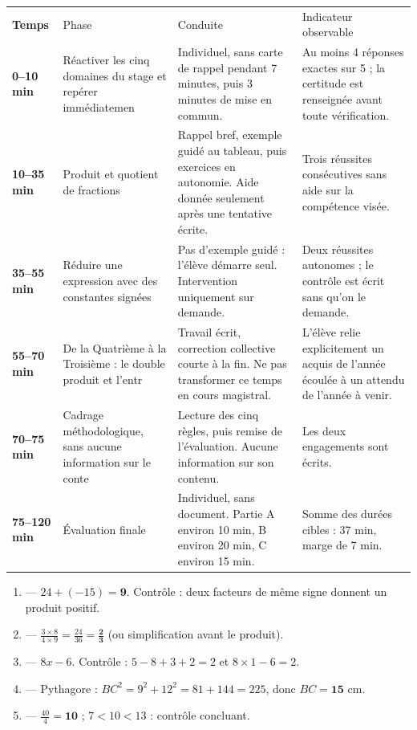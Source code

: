 \documentclass[10pt,a4paper]{article}
\begin{document}
\par\noindent\begin{tabularx}{\linewidth}{>{\bfseries}p{18mm} p{34mm} X X}
\rowcolor{Navy}\color{white}Temps & \color{white}Phase & \color{white}Conduite & \color{white}Indicateur observable \\
0--10 min & Réactiver les cinq domaines du stage et repérer immédiatemen & Individuel, sans carte de rappel pendant 7 minutes, puis 3 minutes de mise en commun. & Au moins 4 réponses exactes sur 5 ; la certitude est renseignée avant toute vérification. \\
10--35 min & Produit et quotient de fractions & Rappel bref, exemple guidé au tableau, puis exercices en autonomie. Aide donnée seulement après une tentative écrite. & Trois réussites consécutives sans aide sur la compétence visée. \\
35--55 min & Réduire une expression avec des constantes signées & Pas d'exemple guidé : l'élève démarre seul. Intervention uniquement sur demande. & Deux réussites autonomes ; le contrôle est écrit sans qu'on le demande. \\
55--70 min & De la Quatrième à la Troisième : le double produit et l'entr & Travail écrit, correction collective courte à la fin. Ne pas transformer ce temps en cours magistral. & L'élève relie explicitement un acquis de l'année écoulée à un attendu de l'année à venir. \\
70--75 min & Cadrage méthodologique, sans aucune information sur le conte & Lecture des cinq règles, puis remise de l'évaluation. Aucune information sur son contenu. & Les deux engagements sont écrits. \\
75--120 min & Évaluation finale & Individuel, sans document. Partie A environ 10 min, B environ 20 min, C environ 15 min. & Somme des durées cibles : 37 min, marge de 7 min. \\
\end{tabularx}
\newpage{}
\begin{enumerate}
\item {} --- $24 + (-15) = \mathbf{9}$. Contrôle : deux facteurs de même signe donnent un produit positif.
\item {} --- $\frac{3\times 8}{4\times 9}=\frac{24}{36}=\mathbf{\frac{2}{3}}$ (ou simplification avant le produit).
\item {} --- $8x-6$. Contrôle : $5-8+3+2=2$ et $8\times 1-6=2$.
\item {} --- Pythagore : $BC^2=9^2+12^2=81+144=225$, donc $BC=\mathbf{15}$ cm.
\item {} --- $\frac{40}{4}=\mathbf{10}$ ; $7 < 10 < 13$ : contrôle concluant.
\end{enumerate}
\end{document}
